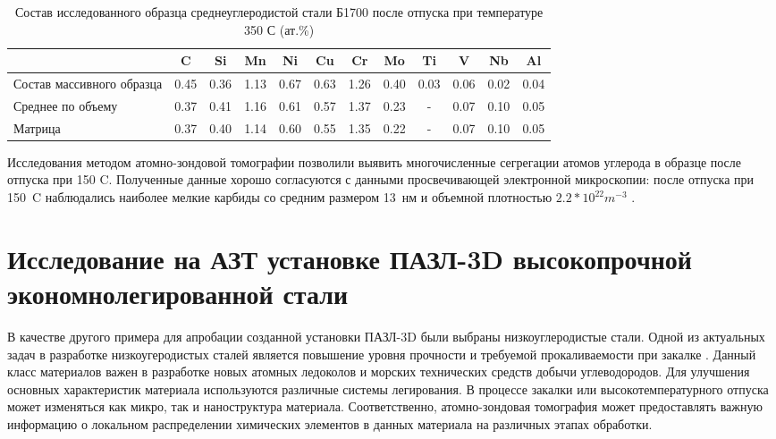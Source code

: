 \begin{table} [htbp]
	\centering
	\caption{Состав исследованного образца среднеуглеродистой стали Б1700 после отпуска при температуре 350 \textdegree С (ат.\%)}%
	\label{tab:SteelComposition350}%
	\begin{SingleSpace}
		\begin{tabular}{|p{3cm}| c | c | c | c | c | c | c | c | c | c | c |}
			\hline
			& C & Si & Mn & Ni & Cu & Cr & Mo & Ti & V & Nb & Al     \\ \hline
			Состав массивного образца     & 0.45 & 0.36 & 1.13 & 0.67 & 0.63 & 1.26 & 0.40 & 0.03 & 0.06 & 0.02 & 0.04   \\ \hline
			Среднее по объему   & 0.37 & 0.41 & 1.16 & 0.61 & 0.57 & 1.37 & 0.23 & - & 0.07 & 0.10 & 0.05   \\  \hline		
			Матрица   & 0.37 & 0.40 & 1.14 & 0.60 & 0.55 & 1.35 & 0.22 & - & 0.07 & 0.10 & 0.05   \\  \hline		
		\end{tabular}%
	\end{SingleSpace}
\end{table}
\FloatBarrier
Исследования методом атомно-зондовой томографии позволили выявить многочисленные сегрегации атомов углерода в образце после отпуска при 150 \textdegree C. Полученные данные хорошо согласуются с данными просвечивающей электронной микроскопии: после отпуска при 150~\textdegree C наблюдались наиболее мелкие карбиды со средним размером 13~нм и объемной плотностью $2.2*10^{22} m^{-3}$ \cite{scbibRyabov}.

\FloatBarrier

\section{Исследование на АЗТ установке ПАЗЛ-3D высокопрочной экономнолегированной стали}\label{sec:ch4/sect3}

В качестве другого примера для апробации созданной установки ПАЗЛ-3D были выбраны низкоуглеродистые стали. Одной из актуальных задач в разработке низкоугеродистых сталей является повышение уровня прочности и требуемой прокаливаемости при закалке \cite{scbibGlubev}. Данный класс материалов важен в разработке новых атомных ледоколов и морских технических средств добычи углеводородов. Для улучшения основных характеристик материала используются различные системы легирования. В процессе закалки или высокотемпературного отпуска может изменяться как микро, так и наноструктура материала. Соответственно, атомно-зондовая томография может предоставлять важную информацию о локальном распределении химических элементов в данных материала на различных этапах обработки.

